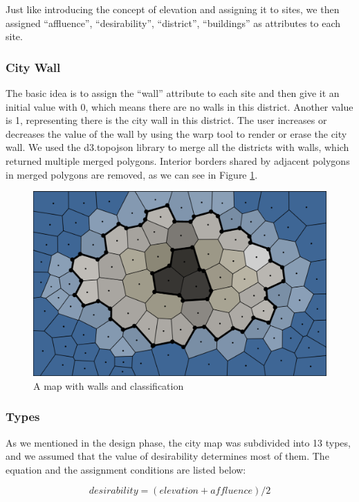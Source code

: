 Just like introducing the concept of elevation and assigning it to sites, we then assigned ``affluence'', ``desirability'', ``district'', ``buildings'' as attributes to each site.

\subsubsection{City Wall}
The basic idea is to assign the ``wall'' attribute to each site and then give it an initial value with 0, which means there are no walls in this district. Another value is 1, representing there is the city wall in this district. The user increases or decreases the value of the wall by using the warp tool to render or erase the city wall. We used the d3.topojson library to merge all the districts with walls, which returned multiple merged polygons. Interior borders shared by adjacent polygons in merged polygons are removed, as we can see in Figure \ref{fig:city wall and classification}.

\begin{figure}[htbp]
  \includegraphics[width=\textwidth]{section04/assets/Map-wall.png}
  \caption{A map with walls and classification}
  \label{fig:city wall and classification}
\end{figure}

\subsubsection{Types}
As we mentioned in the design phase, the city map was subdivided into 13 types, and we assumed that the value of desirability determines most of them. The equation and the assignment conditions are listed below:

\[ desirability = (elevation + affluence) / 2 \]

